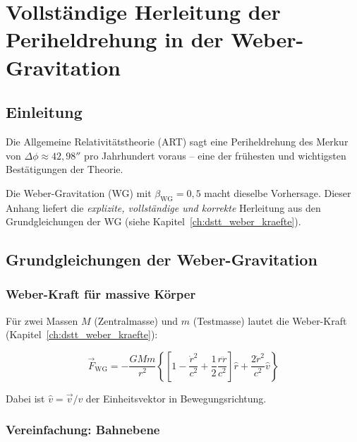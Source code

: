 
\chapter{Vollständige Herleitung der Periheldrehung in der Weber-Gravitation}
\label{app:periheldrehung}

\section{Einleitung}
\label{app:periheldrehung_einleitung}

Die Allgemeine Relativitätstheorie (ART) sagt eine Periheldrehung des Merkur von \( \Delta \phi \approx 42,98'' \) pro Jahrhundert voraus – eine der frühesten und wichtigsten Bestätigungen der Theorie.

Die Weber-Gravitation (WG) mit \( \beta_{\text{WG}} = 0,5 \) macht dieselbe Vorhersage. Dieser Anhang liefert die \emph{explizite, vollständige und korrekte} Herleitung aus den Grundgleichungen der WG (siehe Kapitel~\ref{ch:dstt_weber_kraefte}).

\section{Grundgleichungen der Weber-Gravitation}
\label{app:periheldrehung_grundlagen}

\subsection{Weber-Kraft für massive Körper}
\label{sub:periheldrehung_weber_kraft}

Für zwei Massen \( M \) (Zentralmasse) und \( m \) (Testmasse) lautet die Weber-Kraft (Kapitel~\ref{ch:dstt_weber_kraefte}):

\[
\vec{F}_{\text{WG}} = -\frac{GMm}{r^2} 
\left\{ 
\left[ 1 - \frac{\dot{r}^2}{c^2} + \frac{1}{2} \frac{r\ddot{r}}{c^2} \right] \hat{r} 
+ \frac{2\dot{r}^2}{c^2} \hat{v} 
\right\}
\]

Dabei ist \( \hat{v} = \vec{v}/v \) der Einheitsvektor in Bewegungsrichtung.

\subsection{Vereinfachung: Bahnebene}
\label{sub:periheldrehung_bahnebene}

